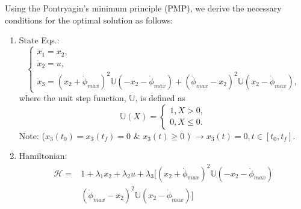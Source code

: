 \documentclass[letterpaper, preprint, paper,11pt]{AAS}	%
\begin{document}
			
			Using the Pontryagin's minimum principle (PMP), we derive the necessary conditions for the optimal solution as follows:
			\begin{enumerate}
				\item State Eqs.:
				\begin{equation}
					\left\{
					\begin{array}{l}
					\dot{x}_1=x_2, \\
					\dot{x}_2=u, \\
					\dot{x}_3=(x_2+\dot{\phi}_{max})^2\mathbb{U}(-x_2-\dot{\phi}_{max})+(\dot{\phi}_{max}-x_2)^2\mathbb{U}(x_2-\dot{\phi}_{max}),
					\end{array}
					\right.
				\end{equation}
				where the unit step function, $\mathbb{U}$, is defined as
				\begin{equation}
					\mathbb{U}(X)=\left\{
					\begin{array}{l}
					1,   X>0, \\
					0,   X\leq 0.
					\end{array}
					\right.
				\end{equation}
				Note:  ($x_3(t_0)=x_3(t_f)=0$ \& $x_3(t)\geq 0$ ) $\rightarrow x_3(t)=0, t\in[t_0, t_f]$. 
				
				\item Hamiltonian:
				\begin{equation}
					\begin{split}
					\mathscr{H}=& 1+\lambda_1x_2+\lambda_2 u+\lambda_3\Big[(x_2+\dot{\phi}_{max})^2\mathbb{U}(-x_2-\dot{\phi}_{max})\\
					& (\dot{\phi}_{max}-x_2)^2\mathbb{U}(x_2-\dot{\phi}_{max})\Big]
					\end{split}
				\end{equation}
			

\end{enumerate}
\end{document}
